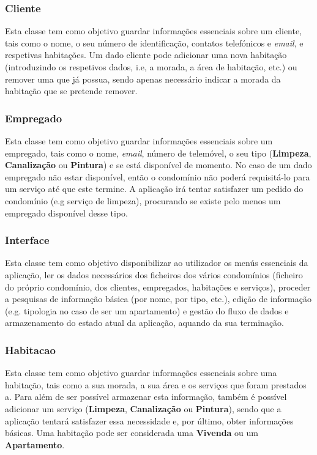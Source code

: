 \documentclass[a4paper]{article}
\begin{document}
\subsubsection{Cliente}

Esta classe tem como objetivo guardar informações essenciais sobre um cliente, tais como o nome, o seu número de identificação, contatos telefónicos e \textit{email}, e respetivas habitações. Um dado cliente pode adicionar uma nova habitação (introduzindo os respetivos dados, i.e, a morada, a área de habitação, etc.) ou remover uma que já possua, sendo apenas necessário indicar a morada da habitação que se pretende remover.

\subsubsection{Empregado}

Esta classe tem como objetivo guardar informações essenciais sobre um empregado, tais como o nome, \textit{email}, número de telemóvel, o seu tipo (\textbf{Limpeza}, \textbf{Canalização} ou \textbf{Pintura}) e se está disponível de momento. No caso de um dado empregado não estar disponível, então o condomínio não poderá requisitá-lo para um serviço até que este termine. A aplicação irá tentar satisfazer um pedido do condomínio (e.g serviço de limpeza), procurando se existe pelo menos um empregado disponível desse tipo.

\subsubsection{Interface}

Esta classe tem como objetivo disponibilizar ao utilizador os menús essenciais da aplicação, ler os dados necessários dos ficheiros dos vários condomínios (ficheiro do próprio condomínio, dos clientes, empregados, habitações e serviços), proceder a pesquisas de informação básica (por nome, por tipo, etc.), edição de informação (e.g. tipologia no caso de ser um apartamento) e gestão do fluxo de dados e armazenamento do estado atual da aplicação, aquando da sua terminação.

\subsubsection{Habitacao}

Esta classe tem como objetivo guardar informações essenciais sobre uma habitação, tais como a sua morada, a sua área e os serviços que foram prestados a. Para além de ser possível armazenar esta informação, também é possível adicionar um serviço (\textbf{Limpeza}, \textbf{Canalização} ou \textbf{Pintura}), sendo que a aplicação tentará satisfazer essa necessidade e, por último, obter informações básicas. Uma habitação pode ser considerada uma \textbf{Vivenda} ou um \textbf{Apartamento}.
\end{document}
